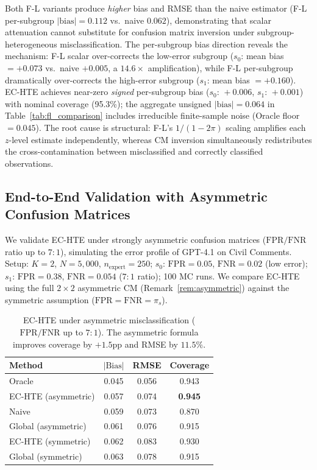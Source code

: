 Both F-L variants produce \emph{higher} bias and RMSE than the naive estimator (F-L per-subgroup $|\text{bias}|{=}0.112$ vs.\ naive $0.062$), demonstrating that scalar attenuation cannot substitute for confusion matrix inversion under subgroup-heterogeneous misclassification.
The per-subgroup bias direction reveals the mechanism: F-L scalar over-corrects the low-error subgroup ($s_0$: mean bias ${=}+0.073$ vs.\ naive $+0.005$, a $14.6\times$ amplification), while F-L per-subgroup dramatically over-corrects the high-error subgroup ($s_1$: mean bias ${=}+0.160$).
EC-HTE achieves near-zero \emph{signed} per-subgroup bias ($s_0{:}\,{+}0.006$, $s_1{:}\,{+}0.001$) with nominal coverage (95.3\%); the aggregate unsigned $|\text{bias}|{=}0.064$ in Table~\ref{tab:fl_comparison} includes irreducible finite-sample noise (Oracle floor $= 0.045$).
The root cause is structural: F-L's $1/(1{-}2\pi)$ scaling amplifies each $z$-level estimate independently, whereas CM inversion simultaneously redistributes the cross-contamination between misclassified and correctly classified observations.

\subsection{End-to-End Validation with Asymmetric Confusion Matrices}
\label{app:asymmetric_endtoend}

We validate EC-HTE under strongly asymmetric confusion matrices ($\mathrm{FPR}/\mathrm{FNR}$ ratio up to $7{:}1$), simulating the error profile of GPT-4.1 on Civil Comments.
Setup: $K{=}2$, $N{=}5{,}000$, $n_{\text{expert}}{=}250$; $s_0$: $\mathrm{FPR}{=}0.05$, $\mathrm{FNR}{=}0.02$ (low error); $s_1$: $\mathrm{FPR}{=}0.38$, $\mathrm{FNR}{=}0.054$ ($7{:}1$ ratio); 100 MC runs.
We compare EC-HTE using the full $2{\times}2$ asymmetric CM (Remark~\ref{rem:asymmetric}) against the symmetric assumption ($\mathrm{FPR}{=}\mathrm{FNR}{=}\pi_s$).

\begin{table}[h]
\centering
\caption{EC-HTE under asymmetric misclassification ($\mathrm{FPR}/\mathrm{FNR}$ up to $7{:}1$). The asymmetric formula improves coverage by $+1.5$pp and RMSE by $11.5\%$.}
\label{tab:asymmetric_endtoend}
\small
\begin{tabular}{lccc}
\toprule
Method & $|\text{Bias}|$ & RMSE & Coverage \\
\midrule
Oracle              & 0.045 & 0.056 & 0.943 \\
EC-HTE (asymmetric) & 0.057 & 0.074 & \textbf{0.945} \\
Naive               & 0.059 & 0.073 & 0.870 \\
Global (asymmetric) & 0.061 & 0.076 & 0.915 \\
EC-HTE (symmetric)  & 0.062 & 0.083 & 0.930 \\
Global (symmetric)  & 0.063 & 0.078 & 0.915 \\
\bottomrule
\end{tabular}
\end{table}

